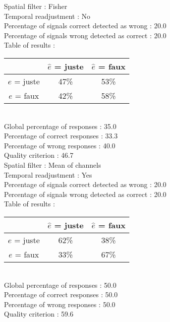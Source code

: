 Spatial filter : Fisher \\
Temporal readjustment : No \\
Percentage of signals correct detected as wrong :   20.0 \\
Percentage of signals wrong detected as correct :   20.0 \\
Table of results : \\
\begin{tabular}{|c|c|c|}
\hline				& $\hat{e}$ = juste & $\hat{e}$ = faux \\
\hline  $e$ = juste	&     47\%			&     53\%		\\
\hline  $e$ = faux	&     42\%			&     58\%		\\
\hline
\end{tabular}\\
Global percentage of responses :   35.0 \\
Percentage of correct responses :   33.3 \\
Percentage of wrong responses :   40.0 \\
Quality criterion :   46.7 \\

Spatial filter : Mean of channels \\
Temporal readjustment : Yes \\
Percentage of signals correct detected as wrong :   20.0 \\
Percentage of signals wrong detected as correct :   20.0 \\
Table of results : \\
\begin{tabular}{|c|c|c|}
\hline				& $\hat{e}$ = juste & $\hat{e}$ = faux \\
\hline  $e$ = juste	&     62\%			&     38\%		\\
\hline  $e$ = faux	&     33\%			&     67\%		\\
\hline
\end{tabular}\\
Global percentage of responses :   50.0 \\
Percentage of correct responses :   50.0 \\
Percentage of wrong responses :   50.0 \\
Quality criterion :   59.6 \\

